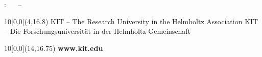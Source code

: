 \begin{titlepage}
	\vspace{2cm}
	\begin{center}
		\large{: \ \timestart{} \ -- \ \timeend}
	\end{center}


	\begin{textblock}{10}[0,0](4,16.8)
		\tiny{
			{KIT -- The Research University in the Helmholtz Association}
			{KIT -- Die Forschungsuniversit\"at in der Helmholtz-Gemeinschaft}
		}
	\end{textblock}

	\begin{textblock}{10}[0,0](14,16.75)
		\large{
			\textbf{www.kit.edu}
		}
	\end{textblock}

\end{titlepage}
